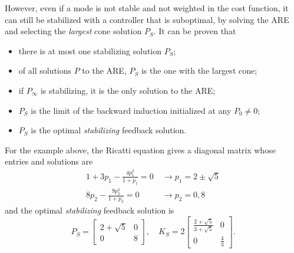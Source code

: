 However, even if a mode is not stable and not weighted in the cost function, it can still be stabilized with a controller that is suboptimal, by solving the ARE and selecting the \emph{largest} cone solution $P_S$. It can be proven that
\begin{itemize}
\item there is at most one stabilizing solution $P_S$;
\item of all solutions $P$ to the ARE, $P_S$ is the one with the largest cone;
\item if $P_\infty$ is stabilizing, it is the only solution to the ARE;
\item $P_S$ is the limit of the backward induction initialized at any $P_0\ne 0$;
\item $P_S$ is the optimal \emph{stabilizing} feedback solution.
\end{itemize}

For the example above, the Ricatti equation gives a diagonal matrix whose entries and solutions are
\begin{align*}
  1 + 3p_1 - \frac{4p_1^2}{1+p_1} = 0\ &\rightarrow p_1 = 2\pm \sqrt{5} \\
  8p_2 - \frac{9p_2^2}{1+p_2} = 0\ &\rightarrow p_2 = 0, 8
\end{align*}
and the optimal \emph{stabilizing} feedback solution is
\begin{equation*}
  P_S =
  \begin{bmatrix}
    2 + \sqrt{5} & 0 \\ 0 & 8
  \end{bmatrix},\quad K_S =
  2\begin{bmatrix}
    \frac{2+\sqrt{5}}{3+\sqrt{5}} & 0 \\ 0 & \frac{4}{3}
  \end{bmatrix}.
\end{equation*}

